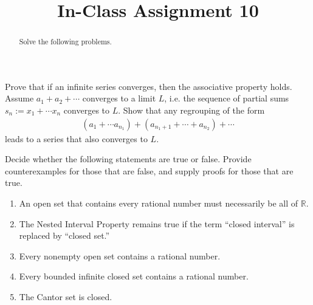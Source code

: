 \documentclass{ximera}
\begin{document}
    \title{In-Class Assignment 10}
    \begin{abstract} Solve the following problems. \end{abstract}
    \maketitle

\begin{exercise}
    Prove that if an infinite series converges, then the associative property holds.  Assume $a_1 + a_2 + \cdots $ converges to a limit $L$, i.e. the sequence of partial sums $s_n := x_1 + \cdots x_n$ converges to $L$.  Show that any regrouping of the form
    \begin{align*}
        (a_1 + \cdots a_{n_1}) + (a_{n_1+1} + \cdots + a_{n_2}) + \cdots
    \end{align*}
    leads to a series that also converges to $L$.
\end{exercise}
\newpage

\begin{exercise}
    Decide whether the following statements are true or false. Provide counterexamples for those
that are false, and supply proofs for those that are true.
\begin{enumerate}
    \item  An open set that contains every rational number must necessarily be all of $\mathbb{R}$.
    \vfill
\item The Nested Interval Property remains true if the term “closed interval” is replaced by
``closed set.”
\vfill
\item Every nonempty open set contains a rational number.
\vfill
\item  Every bounded infinite closed set contains a rational number.
\vfill
\item The Cantor set is closed.
\vfill
\end{enumerate}
\end{exercise}
\end{document}
